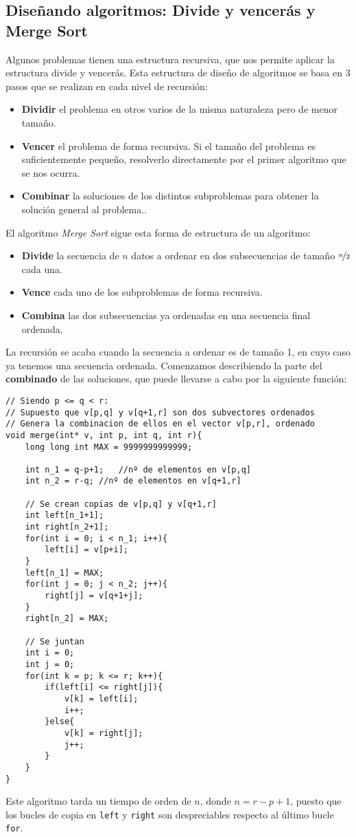 \subsection{Diseñando algoritmos: Divide y vencerás y Merge Sort}
Algunos problemas tienen una estructura recursiva, que nos permite aplicar la estructura divide y vencerás. Esta estructura de diseño de algoritmos se basa en 3 pasos que se realizan en cada nivel de recursión:
\begin{itemize}
    \item \textbf{Dividir} el problema en otros varios de la misma naturaleza pero de menor tamaño.
    \item \textbf{Vencer} el problema de forma recursiva. Si el tamaño del problema es suficientemente pequeño, resolverlo directamente por el primer algoritmo que se nos ocurra.
    \item \textbf{Combinar} la soluciones de los distintos subproblemas para obtener la solución general al problema..
\end{itemize}
El algoritmo \textit{Merge Sort} sigue esta forma de estructura de un algoritmo:
\begin{itemize}
    \item \textbf{Divide} la secuencia de $n$ datos a ordenar en dos subsecuencias de tamaño $\nicefrac{n}{2}$ cada una.
    \item \textbf{Vence} cada uno de los subproblemas de forma recursiva.
    \item \textbf{Combina} las dos subsecuencias ya ordenadas en una secuencia final ordenada.
\end{itemize}
La recursión se acaba cuando la secuencia a ordenar es de tamaño 1, en cuyo caso ya tenemos una secuencia ordenada. Comenzamos describiendo la parte del \textbf{combinado} de las soluciones, que puede llevarse a cabo por la siguiente función:
\begin{verbatim}
// Siendo p <= q < r:
// Supuesto que v[p,q] y v[q+1,r] son dos subvectores ordenados
// Genera la combinacion de ellos en el vector v[p,r], ordenado
void merge(int* v, int p, int q, int r){
    long long int MAX = 9999999999999;

    int n_1 = q-p+1;   //nº de elementos en v[p,q]
    int n_2 = r-q; //nº de elementos en v[q+1,r]

    // Se crean copias de v[p,q] y v[q+1,r]
    int left[n_1+1];
    int right[n_2+1];
    for(int i = 0; i < n_1; i++){
        left[i] = v[p+i];
    }
    left[n_1] = MAX;
    for(int j = 0; j < n_2; j++){
        right[j] = v[q+1+j];
    }
    right[n_2] = MAX;

    // Se juntan
    int i = 0;
    int j = 0;
    for(int k = p; k <= r; k++){
        if(left[i] <= right[j]){
            v[k] = left[i];
            i++;
        }else{
            v[k] = right[j];
            j++;
        }
    }
}
\end{verbatim}
Este algoritmo tarda un tiempo de orden de $n$, donde $n = r-p+1$, puesto que los bucles de copia en \texttt{left} y \texttt{right} son despreciables respecto al último bucle \texttt{for}.\\

